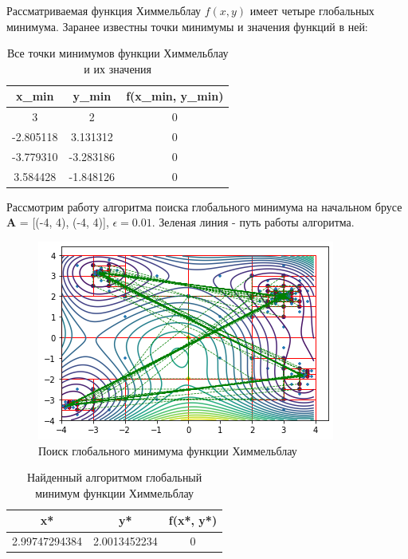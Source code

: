Рассматриваемая функция Химмельблау $f(x, y)$ имеет четыре глобальных минимума. Заранее известны точки минимумы и значения функций в ней:

\begin{table}[H]
	\centering
	\begin{tabular}{| c | c | c |}
		\hline
		    x_{min} & y_{min} & f(x_{min}, y_{min}) \\
		\hline
		    3 & 2 & 0 \\
		    -2.805118 & 3.131312 & 0 \\
		    -3.779310 & -3.283186 & 0 \\
		    3.584428 & -1.848126 & 0 \\
   		\hline
	\end{tabular}
	\caption{Все точки минимумов функции Химмельблау и их значения}
\end{table}

Рассмотрим работу алгоритма поиска глобального минимума на начальном брусе \textbf{A} = [(-4, 4), (-4, 4)], $\epsilon = 0.01$. Зеленая линия - путь работы алгоритма.

\begin{figure}[H]
	\centering
		\includegraphics{task2/resources/Figure_4.png}
	\caption{Поиск глобального минимума функции Химмельблау}
	\label{w_pert}
\end{figure}

\begin{table}[H]
	\centering
	\begin{tabular}{| c | c | c |}
		\hline
		    x* & y* & f(x*, y*) \\
		\hline
		    2.99747294384 & 2.0013452234 & 0 \\
   		\hline
	\end{tabular}
	\caption{Найденный алгоритмом глобальный минимум функции Химмельблау}
\end{table}
